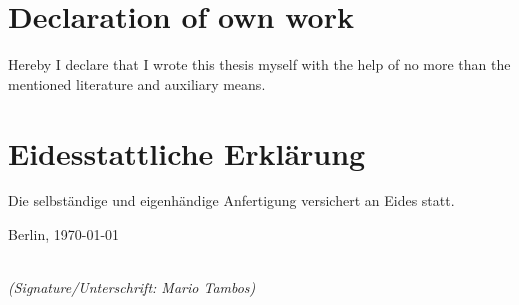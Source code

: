 \documentclass[a4paper]{standalone}
\begin{document}
\newpage

\thispagestyle{empty}

\vspace*{6cm}
\section*{Declaration of own work}
\begin{large}
    
    \noindent
    Hereby I declare that I wrote this thesis myself with the help of no more than the mentioned literature and auxiliary means.
\end{large}

\vspace{2cm}
    
\section*{Eidesstattliche Erklärung}
\begin{large}
    \noindent
    Die selbständige und eigenhändige Anfertigung versichert an Eides statt.
    \vspace{2cm}
    
    \noindent
    Berlin, \today
    
    \vspace{3cm}
    
    \hspace*{7cm}%
    \dotfill\\
    \hspace*{7.5cm}%
    \textit{(Signature/Unterschrift: Mario Tambos)}
    
\end{large}
\end{document}
